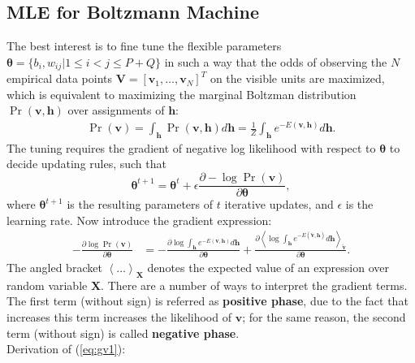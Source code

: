 \documentclass[11pt]{article}
\newcommand{\mean}[2]{\left\langle{#1}\right\rangle_{#2}}
\newcommand{\vh}{\boldsymbol{h}}
\newcommand{\vv}{\boldsymbol{v}}
\newcommand{\mv}{\boldsymbol{V}}
\newcommand{\mx}{\boldsymbol{X}}
\newcommand{\vvt}{\tilde{\vv}}
\newcommand{\pEC}{\boldsymbol{\theta}}
\newcommand{\PDV}[2]{\frac{\partial #1}{\partial #2}}
\begin{document}
\subsection{MLE for Boltzmann Machine}
The best interest is to fine tune the flexible parameters $\pEC=\{b_i, w_{ij} | 1 \le i < j \le P+Q \}$ in such a way that the odds of observing the $N$ empirical data points $\mv=[\vv_1, \dots, \vv_N]^T$ on the visible units are maximized, which is equivalent to maximizing the marginal Boltzman distribution $\Pr(\vv, \vh)$ over assignments of $\vh$:
\begin{equation} \label{eq:p(v)}  %
  \begin{split}
    \Pr(\vv) = \int_{\vh}{\Pr(\vv, \vh)d\vh} = \frac{1}{Z} \int_{\vh}{e^{-E(\vv, \vh)}d\vh}.
  \end{split}
\end{equation}
The tuning requires the gradient of negative log likelihood with respect to $\pEC$ to decide updating rules, such that
\[ \pEC^{t+1} = \pEC^t + \epsilon \PDV{-\log{\Pr(\vv)}}{\pEC}, \]
where $\pEC^{t+1}$ is the resulting parameters of $t$ iterative updates, and $\epsilon$ is the learning rate. Now introduce the gradient expression:
\begin{align}\label{eq:gv1}
  -\PDV{\log{\Pr(\vv)}}{\pEC} &= -\PDV{\log{\int_{\vh}{e^{-E(\vv, \vh)}d\vh}}}{\pEC} + \PDV{\mean{\log{\int_{\vh}{e^{-E(\vvt, \vh)}d\vh}}}{\vvt}}{\pEC}.
\end{align}
The angled bracket $\mean{\dots}{\mx}$ denotes the expected value of an expression over random variable $\mx$.
There are a number of ways to interpret the gradient terms. The first term (without sign) is referred as \textbf{positive phase}, due to the fact that increases this term increases the likelihood of $\vv$; for the same reason, the second term (without sign) is called \textbf{negative phase}.\\
Derivation of (\ref{eq:gv1}):
\end{document}
